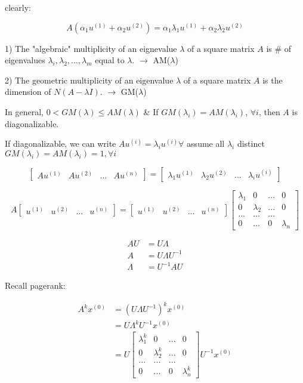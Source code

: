 clearly:

\begin{equation*}
A(\alpha_1u^{(1)} + \alpha_2u^{(2)}) = \alpha_1\lambda_1u^{(1)} + \alpha_2\lambda_2u^{(2)}
\end{equation*}

1) The "algebraic" multiplicity of an eignevalue $\lambda$ of a square matrix $A$ is \# of eigenvalues $\lambda_i, \lambda_2,...,\lambda_m$ equal to $\lambda$. $\rightarrow$ AM($\lambda$)

2) The geometric multiplicity of an eigenvalue $\lambda$ of a square matrix $A$ is the dimension of $N(A - \lambda I)$. $\rightarrow$ GM($\lambda$)

In general, $0 < GM(\lambda) \leq AM(\lambda)$ \& If $GM(\lambda_i) = AM(\lambda_i)$, $\forall i$, then $A$ is diagonalizable. 


If diagonalizable, we can write $Au^{(i)} = \lambda_iu^{(i)} \forall$ assume all $\lambda_i$ distinct $GM(\lambda_i) = AM(\lambda_i) = 1, \forall i$

$$
\left[
\begin{matrix}
Au^{(1)} & Au^{(2)} &... &Au^{(n)} 
\end{matrix}
\right] =
\left[
\begin{matrix}
\lambda_1u^{(1)} & \lambda_2u^{(2)}&... &\lambda_iu^{(i)}
\end{matrix}
\right]
$$

$$A
\left[
\begin{matrix}
u^{(1)} & u^{(2)} &... &u^{(n)} 
\end{matrix}
\right] =
\left[
\begin{matrix}
u^{(1)} & u^{(2)} &... &u^{(n)}
\end{matrix}
\right]
\left[
\begin{matrix}
\lambda_1 & 0 & ... & 0\\
0& \lambda_2  &  ... & 0\\
...  & ...  &   ...& \\
0    &  ... &  0 & \lambda_n
\end{matrix}
\right]
$$



\begin{align*}
AU &= U\Lambda\\
A &= U\Lambda U^{-1}\\
\Lambda &= U^{-1}AU
\end{align*}

Recall pagerank:

\begin{align*}
A^kx^{(0)} &= (U\Lambda U^{-1})^kx^{(0)}\\
&=U\Lambda^kU^{-1}x^{(0)} \\
&= U
\begin{bmatrix}
\lambda_1^k & 0 & ... & 0\\
0& \lambda_2^k  &  ... & 0\\
...  & ...  &   ...& \\
0    &  ... &  0 & \lambda_n^k
\end{bmatrix} U^{-1}x^{(0)}
\end{align*}


